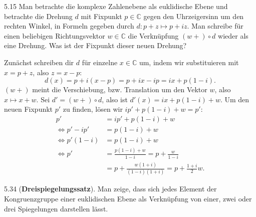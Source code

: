 \begin{exercise}{5.1}{5}
    Man betrachte die komplexe Zahlenebene als euklidische Ebene und
    betrachte die Drehung $d$ mit Fixpunkt $p \in \mathbb C$ gegen den Uhrzeigersinn um den
    rechten Winkel, in Formeln gegeben durch $d : p + z\mapsto p + iz$. Man schreibe für
    einen beliebigen Richtungsvektor $w \in \mathbb C$ die Verknüpfung $(w+) \circ d$ wieder als
    eine Drehung. Was ist der Fixpunkt dieser neuen Drehung?
\end{exercise}

Zunächst schreiben dir $d$ für einzelne $x \in \mathbb C$ um, indem wir substituieren mit $x = p + z$, also $z = x -p $:
\[
    d(x) = p+i(x-p) = p+ix -ip= ix +p(1-i).
\]
$(w+)$ meint die Verschiebung, bzw. Translation um den Vektor $w$, also $x \mapsto x +w$.
Sei $d' = (w+) \circ d$, also ist $d'(x) = ix + p(1-i) +w$.
Um den neuen Fixpunkt $p'$ zu finden, lösen wir $ip'+p(1-i)+w=p'$:
\begin{align*}
    p' &= ip'+p(1-i)+w\\
    \Leftrightarrow p' - ip' &= p(1-i)+w\\
    \Leftrightarrow p'(1-i) &= p(1-i)+w\\
    \Leftrightarrow p' &= \frac{p(1-i)+w}{1-i} = p + \frac{w}{1-i}\\
    &= p + \frac{w(1+i)}{(1-i)(1+i)} = \boxed{p + \frac{1+i}{2}w}.
\end{align*}

\newpage
\begin{exercise}{5.3}{4}
    (\textbf{Dreispiegelungssatz}). Man zeige, dass sich jedes Element der Kongruenzgruppe einer euklidischen Ebene als Verknüpfung von einer, zwei oder drei
    Spiegelungen darstellen lässt.
\end{exercise}

